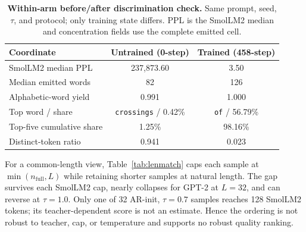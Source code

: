 \documentclass{article}
\newcommand{\armA}{AR-init}
\begin{document}
\begin{table}[!t]
  \caption{\textbf{Within-arm before/after discrimination check.}  Same
  prompt, seed, $\tau$, and protocol; only training state differs.  PPL is the
  SmolLM2 median and concentration fields use the complete emitted cell.}
  \label{tab:discrim}
  \centering
  \small
  \setlength{\tabcolsep}{3.5pt}
  \begin{tabular}{@{}lcc@{}}
    \toprule
    Coordinate & Untrained (0-step) & Trained (458-step) \\
    \midrule
    SmolLM2 median PPL & 237{,}873.60 & 3.50 \\
    Median emitted words & 82 & 126 \\
    Alphabetic-word yield & 0.991 & 1.000 \\
    Top word / share & \texttt{crossings} / 0.42\% & \texttt{of} / 56.79\% \\
    Top-five cumulative share & 1.25\% & 98.16\% \\
    Distinct-token ratio & 0.941 & 0.023 \\
    \bottomrule
  \end{tabular}
\end{table}

For a common-length view, Table~\ref{tab:lenmatch} caps each sample at
$\min(n_{\mathrm{full}},L)$ while retaining shorter samples at natural length.
The gap survives each SmolLM2 cap, nearly collapses for GPT-2 at $L=32$, and
can reverse at $\tau=1.0$.  Only one of 32 \armA{}, $\tau=0.7$ samples reaches
128 SmolLM2 tokens; its teacher-dependent score is not an estimate.  Hence the
ordering is not robust to teacher, cap, or temperature and supports no robust
quality ranking.
\end{document}
